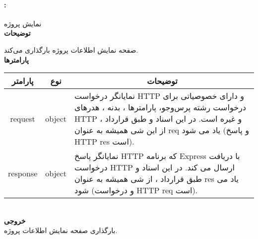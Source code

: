\paragraph{:}
نمایش پروژه‌ 
\\
\textbf{توضیحات}
\hr
\begin{flushleft}
	\framebox[.9\textwidth][l]{
		\lr{
			\textcolor{type}{void}
			\textcolor{func}{getDetailProject}
			\textcolor{symb}{(}
			\textcolor{type}{object}
			\textcolor{arg}{request}
			\textcolor{symb}{,}
			\textcolor{type}{object}
			\textcolor{arg}{response}
			\textcolor{symb}{);}
		}
	}
\end{flushleft}
صفحه نمایش اطلاعات پروژه بارگذاری می‌کند.
\\
\textbf{پارامترها}
\hr \\[10pt]
\begin{tabular}{|m{4cm}|m{3cm}|m{10cm}|}
	\hline
	\multicolumn{1}{|c}{پارامتر}
	&
	\multicolumn{1}{|c}{نوع}
	&
	\multicolumn{1}{|c|}{توضیحات}
	\\
	\hline
	\multicolumn{1}{|c}{request}
	&
	\multicolumn{1}{|c|}{object}
	&
	نمایانگر درخواست HTTP و دارای خصوصیاتی برای درخواست رشته پرس‌و‌جو، پارامترها ، بدنه ، هدرهای HTTP و غیره است.
	در این اسناد و طبق قرارداد ، از این شی همیشه به عنوان req یاد می شود (و پاسخ HTTP res است).
	\\
	\hline
	\multicolumn{1}{|c}{response}
	&
	\multicolumn{1}{|c|}{object}
	&
	نمایانگر پاسخ HTTP که برنامه Express با دریافت درخواست HTTP ارسال می کند.
	در این اسناد و طبق قرارداد ، از شی همیشه به عنوان res یاد می شود (و درخواست HTTP req است).
	\\
	\hline
\end{tabular}
\\[10pt]
\textbf{خروجی}
\hr \\
بارگذاری صفحه نمایش اطلاعات پروژه.

